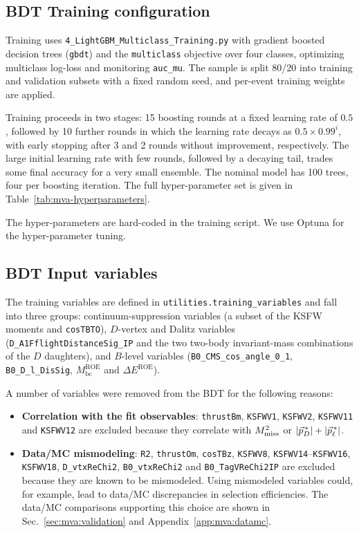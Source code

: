 \subsection{BDT Training configuration}
\label{sec:mva:training}

Training uses \texttt{4\_LightGBM\_Multiclass\_Training.py} with gradient
boosted decision trees (\texttt{gbdt}) and the \texttt{multiclass} objective
over four classes, optimizing multiclass log-loss and monitoring
\texttt{auc\_mu}.
The sample is split 80/20 into training and validation subsets with a fixed
random seed, and per-event training weights are applied.

Training proceeds in two stages: 15 boosting rounds at a fixed learning rate
of $0.5$, followed by 10 further rounds in which the learning rate decays as
$0.5 \times 0.99^{i}$, with early stopping after 3 and 2 rounds without
improvement, respectively.
The large initial learning rate with few rounds, followed by a decaying tail,
trades some final accuracy for a very small ensemble.
The nominal model has 100 trees, four per boosting iteration.
The full hyper-parameter set is given in Table~\ref{tab:mva-hyperparameters}.


The hyper-parameters are hard-coded in the training script.
We use Optuna for the hyper-parameter tuning.



\subsection{BDT Input variables}
\label{sec:mva:inputs}

The training variables are defined in
\texttt{utilities.training\_variables} and fall into three groups:
continuum-suppression variables (a subset of the KSFW moments and
\texttt{cosTBTO}), $D$-vertex and Dalitz variables
(\texttt{D\_A1FflightDistanceSig\_IP} and the two two-body invariant-mass
combinations of the $D$ daughters), and $B$-level variables
(\texttt{B0\_CMS\_cos\_angle\_0\_1}, \texttt{B0\_D\_l\_DisSig},
$M_{\mathrm{bc}}^{\mathrm{ROE}}$ and $\Delta E^{\mathrm{ROE}}$).

A number of variables were 
removed from the BDT for the following reasons:
\begin{itemize}
  \item \textbf{Correlation with the fit observables}:
        \texttt{thrustBm}, \texttt{KSFWV1}, \texttt{KSFWV2},
        \texttt{KSFWV11} and \texttt{KSFWV12} are excluded because they
        correlate with $M_{\mathrm{miss}}^{2}$ or $|\vec{p}^{\,*}_{D}| + |\vec{p}^{\,*}_{\ell}|$.
        
  \item \textbf{Data/MC mismodeling}: \texttt{R2}, \texttt{thrustOm},
        \texttt{cosTBz}, \texttt{KSFWV8}, \texttt{KSFWV14}--\texttt{KSFWV16}, \texttt{KSFWV18},
        \texttt{D\_vtxReChi2}, \texttt{B0\_vtxReChi2} and
        \texttt{B0\_TagVReChi2IP} are excluded because they are known to be
        mismodeled.
        Using mismodeled variables could, for example, lead to data/MC discrepancies in selection efficiencies.
        The data/MC comparisons supporting this choice are shown in
        Sec.~\ref{sec:mva:validation} and Appendix~\ref{app:mva:datamc}.
\end{itemize}


